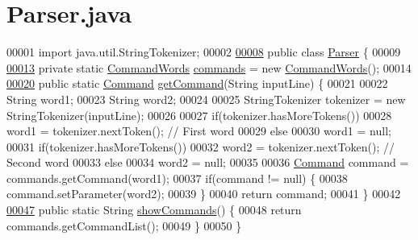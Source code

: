 \hypertarget{Parser_8java_source}{\section{Parser.\-java}
}

\begin{DoxyCode}
00001 \textcolor{keyword}{import} java.util.StringTokenizer;
00002 
\hypertarget{Parser_8java_source_l00008}{}\hyperlink{classParser}{00008} \textcolor{keyword}{public} \textcolor{keyword}{class }\hyperlink{classParser}{Parser} \{
00009 
\hypertarget{Parser_8java_source_l00013}{}\hyperlink{classParser_a6afb99e1595e6bc0705a09ee00dbddd6}{00013}     \textcolor{keyword}{private} \textcolor{keyword}{static} \hyperlink{classCommandWords}{CommandWords} \hyperlink{classParser_a6afb99e1595e6bc0705a09ee00dbddd6}{commands} = \textcolor{keyword}{new} \hyperlink{classCommandWords}{CommandWords}();
00014 
\hypertarget{Parser_8java_source_l00020}{}\hyperlink{classParser_a4b9b987a0c1b0f4f742020f1be21edfa}{00020}     \textcolor{keyword}{public} \textcolor{keyword}{static} \hyperlink{classCommand}{Command} \hyperlink{classParser_a4b9b987a0c1b0f4f742020f1be21edfa}{getCommand}(String inputLine) \{
00021 
00022         String word1;
00023         String word2;
00024 
00025         StringTokenizer tokenizer = \textcolor{keyword}{new} StringTokenizer(inputLine);
00026 
00027         \textcolor{keywordflow}{if}(tokenizer.hasMoreTokens())
00028             word1 = tokenizer.nextToken();  \textcolor{comment}{// First word}
00029         \textcolor{keywordflow}{else}
00030             word1 = null;
00031         \textcolor{keywordflow}{if}(tokenizer.hasMoreTokens())
00032             word2 = tokenizer.nextToken();  \textcolor{comment}{// Second word}
00033         \textcolor{keywordflow}{else}
00034             word2 = null;
00035 
00036         \hyperlink{classCommand}{Command} command = commands.getCommand(word1);
00037         \textcolor{keywordflow}{if}(command != null) \{
00038             command.setParameter(word2);
00039         \}
00040         \textcolor{keywordflow}{return} command;
00041     \}
00042 
\hypertarget{Parser_8java_source_l00047}{}\hyperlink{classParser_a2510fee1c8d7298e222edaf1f34660dc}{00047}     \textcolor{keyword}{public} \textcolor{keyword}{static} String \hyperlink{classParser_a2510fee1c8d7298e222edaf1f34660dc}{showCommands}() \{
00048         \textcolor{keywordflow}{return} commands.getCommandList();
00049     \}
00050 \}
\end{DoxyCode}
